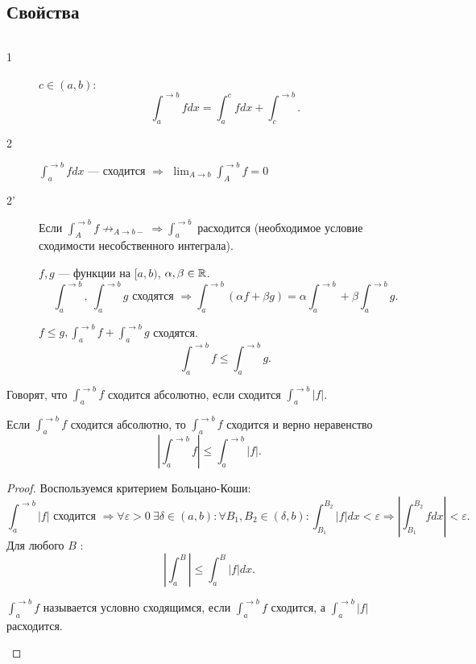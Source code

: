 % 
% 

\subsection{Свойства}
\begin{prop}
    $ $
    \begin{description}
	\item[1] $ c \in  (a, b)$:
	    \[
		\int_{a }^{ \to b}  f dx = \int_{ a }^{c} f dx + \int_{ c}^{ \to b}
	    .\]
	\item [2]$ \int_{a}^{ \to  b} f dx $ --- сходится $ \Longrightarrow $ $ \lim_{A \to  b} \int_{A}^{ \to b} f = 0 $
\item[2'] Если $ \int_{A}^{ \to b} f \not\to_{A \to b-} \Longrightarrow  \int_{a}^{ \to b}  $ расходится (необходимое условие сходимости несобственного интеграла).
\item [] $ f, g$ --- функции на $ [a, b)$,  $ \alpha , \beta  \in \mathbb{R}$.
    \[
	\int_{a}^{  \to b} , ~ \int_{a}^{ \to  b}  g  \text{ сходятся } \Longrightarrow \int_{a}^{\to b} ( \alpha  f + \beta  g)  = \alpha \int_{ a}^{ \to b}      + \beta  \int_{a}^{ \to  b}  g
    .\]
\item  []
    $ f \le  g,  \int_{ a}^{ \to b} f + \int_{a}^{ \to b} g   $ сходятся. \[
	\int_{ a}^{ \to  b} f \le  \int_{ a}^{ \to b}  g
    .\]
    \end{description}
    \begin{defn}
	Говорят, что $ \int_{a}^{\to b} f  $ {\sf   сходится абсолютно}, если сходится $ \int_{a}^{ \to b} |f|  $.
    \end{defn}
    Если $ \int_{a}^{ \to  b} f $ сходится абсолютно, то $ \int_{a}^{ \to  b} f $ сходится и верно неравенство
    \[
	\left| \int_{a}^{ \to b}  f  \right| \le  \int_a ^{ \to b}\left| f  \right|
    .\]
    \begin{proof}
	Воспользуемся критерием Больцано-Коши:
	\[
	    \int_{ a}^{ \to  b} |f| \text{  сходится } \Longrightarrow  \forall  \varepsilon  >0 ~ \exists \delta \in  (a, b): \forall B_1, B_2 \in (\delta,  b): \int_{B_1}^{B_2}  |f| dx < \varepsilon  \Longrightarrow \left| \int_{B_1}^{B_2} f dx  \right| < \varepsilon
	.\]
	Для любого $ B$ :
	\[
	    \left|  \int_{ a}^{B}   \right| \le  \int_{a}^{ B} |f|dx
	.\]
	\begin{defn}
	    $ \int_{a}^{ \to  b} f  $ называется {\sf   условно сходящимся}, если $ \int_{a}^{ \to b} f $ сходится, а $ \int_{a}^{ \to b} |f| $ расходится.

\end{defn}
\end{proof}
\end{prop}
